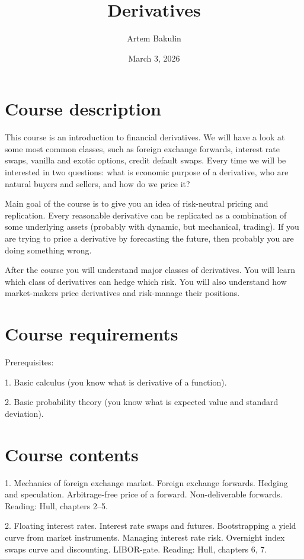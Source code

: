 \documentclass[a4paper,14pt]{extarticle}
\title{Derivatives}
\author{Artem Bakulin}
\date{March 3, 2026}
\begin{document}
\maketitle

\section*{Course description}
This course is an introduction to financial derivatives. We will have a look at some most common
classes, such as foreign exchange forwards, interest rate swaps, vanilla and exotic options, credit
default swaps. Every time we will be interested in two questions: what is economic purpose of a
derivative, who are natural buyers and sellers, and how do we price it?

Main goal of the course is to give you an idea of risk-neutral pricing and replication. Every
reasonable derivative can be replicated as a combination of some underlying assets (probably
with dynamic, but mechanical, trading). If you are trying to price a derivative by forecasting the
future, then probably you are doing something wrong.

After the course you will understand major classes of derivatives. You will learn which class of
derivatives can hedge which risk. You will also understand how market-makers price derivatives
and risk-manage their positions.

\section*{Course requirements}

Prerequisites:

1. Basic calculus (you know what is derivative of a function).

2. Basic probability theory (you know what is expected value and standard deviation).

\section*{Course contents}

1. Mechanics of foreign exchange market. Foreign exchange forwards. Hedging and speculation.
Arbitrage-free price of a forward. Non-deliverable forwards.
Reading: Hull, chapters 2--5.

2. Floating interest rates. Interest rate swaps and futures. Bootstrapping a yield curve from
market instruments. Managing interest rate risk. Overnight index swaps curve and discounting.
LIBOR-gate.
Reading: Hull, chapters 6, 7.
\end{document}
